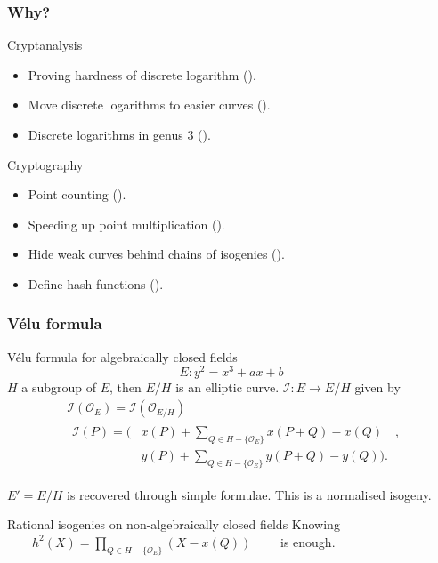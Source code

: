 \documentclass[10pt]{beamer}
\newcommand{\0}{\mathcal{O}}  %
\newcommand{\isog}[1]{\mathcal{#1}}  %
\newcommand{\I}{\isog{I}}  %
\begin{document}

\begin{frame}
  \frametitle{Why?}

  \begin{block}{Cryptanalysis}
    \begin{itemize}
    \item Proving hardness of discrete logarithm (\cite{JMV05}).
    \item Move discrete logarithms to easier curves (\cite{GHS}).
    \item Discrete logarithms in genus $3$ (\cite{Ben}).
    \end{itemize}
  \end{block}
  
  \begin{block}{Cryptography}
    \begin{itemize}
    \item Point counting (\cite{Scho95}).
    \item Speeding up point multiplication (\cite{GLV}).
    \item Hide weak curves behind chains of isogenies (\cite{Tes06}).
    \item Define hash functions (\cite{CLG09}).
    \end{itemize}
  \end{block}
\end{frame}


\begin{frame}
  \frametitle{Vélu formula}
  
  \begin{block}{Vélu formula for algebraically closed fields}
    \[E : y^2 = x^3 + ax + b\]
    $H$ a subgroup of $E$, then $E/H$ is an elliptic curve. $\I:E\rightarrow E/H$ given by
    \begin{align*}
      &\I(\0_E) = \I(\0_{E/H})\\
      &\begin{aligned}
        \I(P) = \Biggl( &x(P) + \sum_{Q\in H - \{\0_E\}}x(P+Q) - x(Q) \quad,\\
        &y(P) + \sum_{Q\in H - \{\0_E\}}y(P+Q) - y(Q) \Biggr) \text{.}
      \end{aligned}
    \end{align*}

    $E'=E/H$ is recovered through simple formulae. This is a
    normalised isogeny.
  \end{block}

  \begin{block}{Rational isogenies on non-algebraically closed fields}
    \centering Knowing $\qquad h^2(X) = \prod_{Q\in H-\{\0_E\}}\left(X
    - x(Q)\right)\qquad$ is enough.
  \end{block}
\end{frame}
\end{document}

